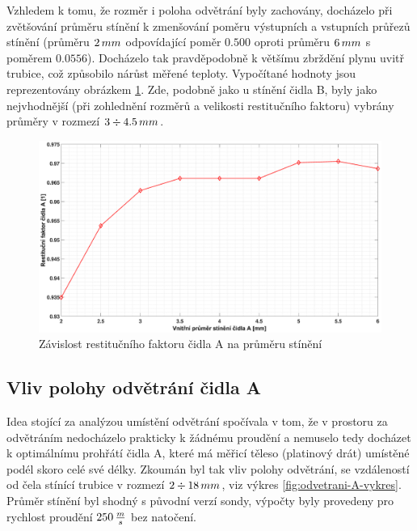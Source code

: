         Vzhledem k tomu, že rozměr i poloha odvětrání byly zachovány, docházelo při zvětšování průměru stínění k zmenšování poměru výstupních a vstupních průřezů stínění (průměru $2 \, mm$ odpovídající poměr $0.500$ oproti průměru $6 \, mm$ s poměrem $0.0556$). Docházelo tak pravděpodobně k většímu zbrždění plynu uvitř trubice, což způsobilo nárůst měřené teploty. Vypočítané hodnoty jsou reprezentovány obrázkem \ref{fig:prumer-stineni-A}. Zde, podobně jako u stínění čidla B, byly jako nejvhodnější (při zohlednění rozměrů a velikosti restitučního faktoru) vybrány průměry v rozmezí $3 \div 4.5 \, mm$.
        
        \begin{figure}[ht!]
            \centering
            \includegraphics*[width=\textwidth, trim={5.25cm 1.0cm 5.8cm 2.0cm}]{400_SIMULACE_KONSTRUKCNICH_UPRAV/Grafy/05_prumer_stineni_A}
            \caption{Závislost restitučního faktoru čidla A na průměru stínění}
            \label{fig:prumer-stineni-A}
        \end{figure}
    
   \newpage
     \subsection{Vliv polohy odvětrání čidla A}
        Idea stojící za analýzou umístění odvětrání spočívala v tom, že v prostoru za odvětráním nedocházelo prakticky k žádnému proudění a nemuselo tedy docházet k optimálnímu prohřátí čidla A, které má měřicí těleso (platinový drát) umístěné podél skoro celé své délky. Zkoumán byl tak vliv polohy odvětrání, se vzdáleností od čela stínící trubice v rozmezí $2 \div 18 \, mm$, viz výkres \ref{fig:odvetrani-A-vykres}. Průměr stínění byl shodný s původní verzí sondy, výpočty byly provedeny pro rychlost proudění $250 \, \frac{m}{s}$ bez natočení.

